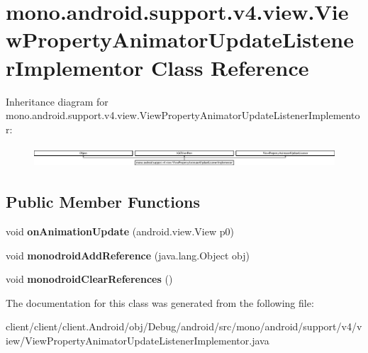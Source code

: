 \hypertarget{classmono_1_1android_1_1support_1_1v4_1_1view_1_1ViewPropertyAnimatorUpdateListenerImplementor}{}\section{mono.\+android.\+support.\+v4.\+view.\+View\+Property\+Animator\+Update\+Listener\+Implementor Class Reference}
\label{classmono_1_1android_1_1support_1_1v4_1_1view_1_1ViewPropertyAnimatorUpdateListenerImplementor}
Inheritance diagram for mono.\+android.\+support.\+v4.\+view.\+View\+Property\+Animator\+Update\+Listener\+Implementor\+:\begin{figure}[H]
\begin{center}
\leavevmode
\includegraphics[height=0.789288cm]{classmono_1_1android_1_1support_1_1v4_1_1view_1_1ViewPropertyAnimatorUpdateListenerImplementor}
\end{center}
\end{figure}
\subsection*{Public Member Functions}
\begin{DoxyCompactItemize}
\item 
\hypertarget{classmono_1_1android_1_1support_1_1v4_1_1view_1_1ViewPropertyAnimatorUpdateListenerImplementor_a4d255e7a411646970a62e3fda262fc90}{}void {\bfseries on\+Animation\+Update} (android.\+view.\+View p0)\label{classmono_1_1android_1_1support_1_1v4_1_1view_1_1ViewPropertyAnimatorUpdateListenerImplementor_a4d255e7a411646970a62e3fda262fc90}

\item 
\hypertarget{classmono_1_1android_1_1support_1_1v4_1_1view_1_1ViewPropertyAnimatorUpdateListenerImplementor_aab23a713316535ff467814de0a1d96b1}{}void {\bfseries monodroid\+Add\+Reference} (java.\+lang.\+Object obj)\label{classmono_1_1android_1_1support_1_1v4_1_1view_1_1ViewPropertyAnimatorUpdateListenerImplementor_aab23a713316535ff467814de0a1d96b1}

\item 
\hypertarget{classmono_1_1android_1_1support_1_1v4_1_1view_1_1ViewPropertyAnimatorUpdateListenerImplementor_a0279030b5e11e7f78669ad7a2a033d8b}{}void {\bfseries monodroid\+Clear\+References} ()\label{classmono_1_1android_1_1support_1_1v4_1_1view_1_1ViewPropertyAnimatorUpdateListenerImplementor_a0279030b5e11e7f78669ad7a2a033d8b}

\end{DoxyCompactItemize}


The documentation for this class was generated from the following file\+:\begin{DoxyCompactItemize}
\item 
client/client/client.\+Android/obj/\+Debug/android/src/mono/android/support/v4/view/View\+Property\+Animator\+Update\+Listener\+Implementor.\+java\end{DoxyCompactItemize}
